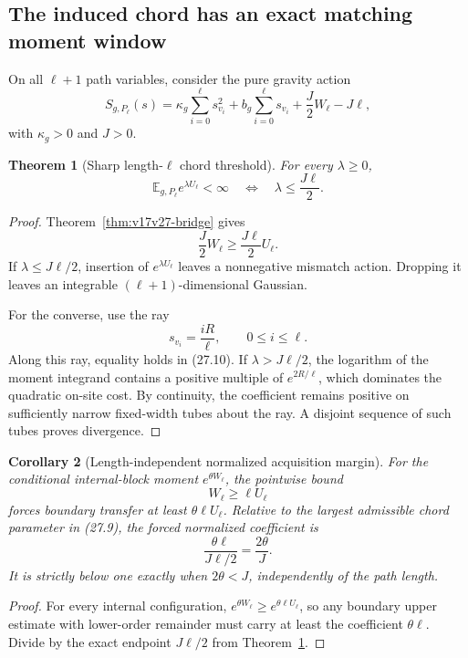 \documentclass[11pt]{article}
\newtheorem{theorem}{Theorem}[section]
\newtheorem{corollary}[theorem]{Corollary}
\theoremstyle{remark}
\begin{document}
\subsection{The induced chord has an exact matching moment window}

On all \(\ell+1\) path variables, consider the pure gravity action
\[
 S_{g,P_\ell}(s)
 =\kappa_g\sum_{i=0}^{\ell}s_{v_i}^2
 +b_g\sum_{i=0}^{\ell}s_{v_i}
 +\frac J2W_\ell-J\ell,                            \tag{27.8}
\]
with \(\kappa_g>0\) and \(J>0\).

\begin{theorem}[Sharp length-\(\ell\) chord threshold]
\label{thm:v17v27-chord-window}
For every \(\lambda\geq0\),
\[
 \mathbb E_{g,P_\ell}e^{\lambda U_\ell}<\infty
 \quad\Longleftrightarrow\quad
 \lambda\leq\frac{J\ell}{2}.                     \tag{27.9}
\]
\end{theorem}

\begin{proof}
Theorem~\ref{thm:v17v27-bridge} gives
\[
 \frac J2W_\ell\geq\frac{J\ell}{2}U_\ell.        \tag{27.10}
\]
If \(\lambda\leq J\ell/2\), insertion of
\(e^{\lambda U_\ell}\) leaves a nonnegative mismatch action.  Dropping
it leaves an integrable \((\ell+1)\)-dimensional Gaussian.

For the converse, use the ray
\[
 s_{v_i}=\frac{iR}{\ell},\qquad0\leq i\leq\ell.    \tag{27.11}
\]
Along this ray, equality holds in (27.10).  If
\(\lambda>J\ell/2\), the logarithm of the moment integrand contains a
positive multiple of \(e^{2R/\ell}\), which dominates the quadratic
on-site cost.  By continuity, the coefficient remains positive on
sufficiently narrow fixed-width tubes about the ray.  A disjoint
sequence of such tubes proves divergence.
\end{proof}

\begin{corollary}[Length-independent normalized acquisition margin]
\label{cor:v17v27-margin}
For the conditional internal-block moment
\(e^{\theta W_\ell}\), the pointwise bound
\[
 W_\ell\geq\ell U_\ell                             \tag{27.12}
\]
forces boundary transfer at least \(\theta\ell U_\ell\).  Relative to
the largest admissible chord parameter in (27.9), the forced normalized
coefficient is
\[
 \frac{\theta\ell}{J\ell/2}=\frac{2\theta}{J}.     \tag{27.13}
\]
It is strictly below one exactly when \(2\theta<J\), independently of
the path length.
\end{corollary}

\begin{proof}
For every internal configuration,
\(e^{\theta W_\ell}\geq e^{\theta\ell U_\ell}\), so any boundary
upper estimate with lower-order remainder must carry at least the
coefficient \(\theta\ell\).  Divide by the exact endpoint
\(J\ell/2\) from Theorem~\ref{thm:v17v27-chord-window}.
\end{proof}
\end{document}
